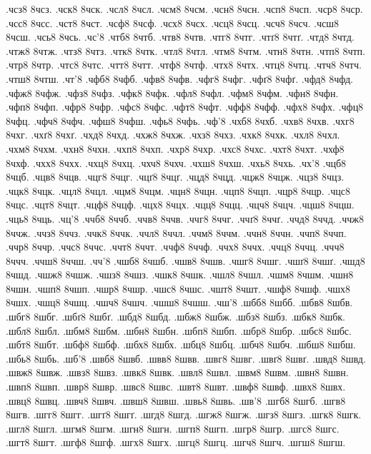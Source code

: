 {.чсз8 8чсз.
.чск8 8чск.
.чсл8 8чсл.
.чсм8 8чсм.
.чсн8 8чсн.
.чсп8 8чсп.
.чср8 8чср.
.чсс8 8чсс.
.чст8 8чст.
.чсф8 8чсф.
.чсх8 8чсх.
.чсц8 8чсц.
.чсч8 8чсч.
.чсш8 8чсш.
.чсь8 8чсь.
.чс'8
.чтб8 8чтб.
.чтв8 8чтв.
.чтг8 8чтг.
.чтґ8 8чтґ.
.чтд8 8чтд.
.чтж8 8чтж.
.чтз8 8чтз.
.чтк8 8чтк.
.чтл8 8чтл.
.чтм8 8чтм.
.чтн8 8чтн.
.чтп8 8чтп.
.чтр8 8чтр.
.чтс8 8чтс.
.чтт8 8чтт.
.чтф8 8чтф.
.чтх8 8чтх.
.чтц8 8чтц.
.чтч8 8чтч.
.чтш8 8чтш.
.чт'8
.чфб8 8чфб.
.чфв8 8чфв.
.чфг8 8чфг.
.чфґ8 8чфґ.
.чфд8 8чфд.
.чфж8 8чфж.
.чфз8 8чфз.
.чфк8 8чфк.
.чфл8 8чфл.
.чфм8 8чфм.
.чфн8 8чфн.
.чфп8 8чфп.
.чфр8 8чфр.
.чфс8 8чфс.
.чфт8 8чфт.
.чфф8 8чфф.
.чфх8 8чфх.
.чфц8 8чфц.
.чфч8 8чфч.
.чфш8 8чфш.
.чфь8 8чфь.
.чф'8
.чхб8 8чхб.
.чхв8 8чхв.
.чхг8 8чхг.
.чхґ8 8чхґ.
.чхд8 8чхд.
.чхж8 8чхж.
.чхз8 8чхз.
.чхк8 8чхк.
.чхл8 8чхл.
.чхм8 8чхм.
.чхн8 8чхн.
.чхп8 8чхп.
.чхр8 8чхр.
.чхс8 8чхс.
.чхт8 8чхт.
.чхф8 8чхф.
.чхх8 8чхх.
.чхц8 8чхц.
.чхч8 8чхч.
.чхш8 8чхш.
.чхь8 8чхь.
.чх'8
.чцб8 8чцб.
.чцв8 8чцв.
.чцг8 8чцг.
.чцґ8 8чцґ.
.чцд8 8чцд.
.чцж8 8чцж.
.чцз8 8чцз.
.чцк8 8чцк.
.чцл8 8чцл.
.чцм8 8чцм.
.чцн8 8чцн.
.чцп8 8чцп.
.чцр8 8чцр.
.чцс8 8чцс.
.чцт8 8чцт.
.чцф8 8чцф.
.чцх8 8чцх.
.чцц8 8чцц.
.чцч8 8чцч.
.чцш8 8чцш.
.чць8 8чць.
.чц'8
.ччб8 8ччб.
.ччв8 8ччв.
.ччг8 8ччг.
.ччґ8 8ччґ.
.ччд8 8ччд.
.ччж8 8ччж.
.ччз8 8ччз.
.ччк8 8ччк.
.ччл8 8ччл.
.ччм8 8ччм.
.ччн8 8ччн.
.ччп8 8ччп.
.ччр8 8ччр.
.ччс8 8ччс.
.ччт8 8ччт.
.ччф8 8ччф.
.ччх8 8ччх.
.ччц8 8ччц.
.ччч8 8ччч.
.ччш8 8ччш.
.чч'8
.чшб8 8чшб.
.чшв8 8чшв.
.чшг8 8чшг.
.чшґ8 8чшґ.
.чшд8 8чшд.
.чшж8 8чшж.
.чшз8 8чшз.
.чшк8 8чшк.
.чшл8 8чшл.
.чшм8 8чшм.
.чшн8 8чшн.
.чшп8 8чшп.
.чшр8 8чшр.
.чшс8 8чшс.
.чшт8 8чшт.
.чшф8 8чшф.
.чшх8 8чшх.
.чшц8 8чшц.
.чшч8 8чшч.
.чшш8 8чшш.
.чш'8
.шбб8 8шбб.
.шбв8 8шбв.
.шбг8 8шбг.
.шбґ8 8шбґ.
.шбд8 8шбд.
.шбж8 8шбж.
.шбз8 8шбз.
.шбк8 8шбк.
.шбл8 8шбл.
.шбм8 8шбм.
.шбн8 8шбн.
.шбп8 8шбп.
.шбр8 8шбр.
.шбс8 8шбс.
.шбт8 8шбт.
.шбф8 8шбф.
.шбх8 8шбх.
.шбц8 8шбц.
.шбч8 8шбч.
.шбш8 8шбш.
.шбь8 8шбь.
.шб'8
.швб8 8швб.
.швв8 8швв.
.швг8 8швг.
.швґ8 8швґ.
.швд8 8швд.
.швж8 8швж.
.швз8 8швз.
.швк8 8швк.
.швл8 8швл.
.швм8 8швм.
.швн8 8швн.
.швп8 8швп.
.швр8 8швр.
.швс8 8швс.
.швт8 8швт.
.швф8 8швф.
.швх8 8швх.
.швц8 8швц.
.швч8 8швч.
.швш8 8швш.
.швь8 8швь.
.шв'8
.шгб8 8шгб.
.шгв8 8шгв.
.шгг8 8шгг.
.шгґ8 8шгґ.
.шгд8 8шгд.
.шгж8 8шгж.
.шгз8 8шгз.
.шгк8 8шгк.
.шгл8 8шгл.
.шгм8 8шгм.
.шгн8 8шгн.
.шгп8 8шгп.
.шгр8 8шгр.
.шгс8 8шгс.
.шгт8 8шгт.
.шгф8 8шгф.
.шгх8 8шгх.
.шгц8 8шгц.
.шгч8 8шгч.
.шгш8 8шгш.
}
